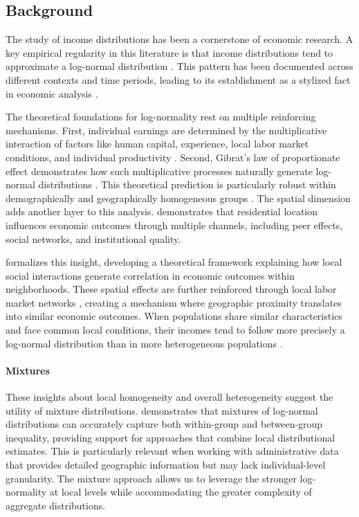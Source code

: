 
\subsection{Background}

The study of income distributions has been a cornerstone of economic research. A key empirical regularity in this literature is that income distributions tend to approximate a log-normal distribution \citep{aitchison1957lognormal}. This pattern has been documented across different contexts and time periods, leading to its establishment as a stylized fact in economic analysis \citep{lopez2006normal}.

The theoretical foundations for log-normality rest on multiple reinforcing mechanisms. First, individual earnings are determined by the multiplicative interaction of factors like human capital, experience, local labor market conditions, and individual productivity \citep{neal2000theories}. Second, Gibrat's law of proportionate effect demonstrates how such multiplicative processes naturally generate log-normal distributions \citep{gibrat1931inegalites}. This theoretical prediction is particularly robust within demographically and geographically homogeneous groups \citep{battistin2009consumption}.
The spatial dimension adds another layer to this analysis. \cite{sampson2012great} demonstrates that residential location influences economic outcomes through multiple channels, including peer effects, social networks, and institutional quality. 

\cite{durlauf2004neighborhood} formalizes this insight, developing a theoretical framework explaining how local social interactions generate correlation in economic outcomes within neighborhoods. These spatial effects are further reinforced through local labor market networks \citep{topa2015neighborhood}, creating a mechanism where geographic proximity translates into similar economic outcomes. When populations share similar characteristics and face common local conditions, their incomes tend to follow more precisely a log-normal distribution than in more heterogeneous populations \citep{mitzenmacher2004brief}.

\paragraph{Mixtures} These insights about local homogeneity and overall heterogeneity suggest the utility of mixture distributions. \cite{parker2012measuring} demonstrates that mixtures of log-normal distributions can accurately capture both within-group and between-group inequality, providing support for approaches that combine local distributional estimates. This is particularly relevant when working with administrative data that provides detailed geographic information but may lack individual-level granularity. The mixture approach allows us to leverage the stronger log-normality at local levels while accommodating the greater complexity of aggregate distributions.

